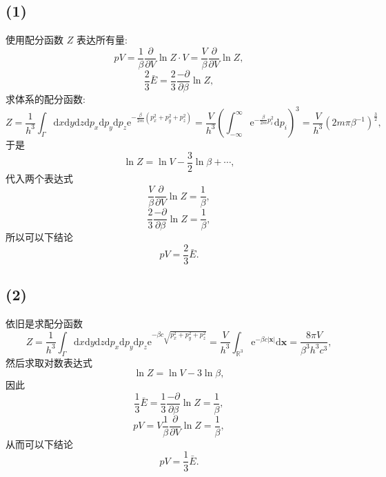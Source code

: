 \documentclass[
    lang=cn,
    column=onecolumn
]{spArticle}
\begin{document}
        \subsection{(1)}
            使用配分函数 $Z$ 表达所有量:
            $$
            pV=\frac{1}{\beta}\frac{\partial}{\partial V}\ln Z\cdot V=\frac{V}{\beta}\frac{\partial}{\partial V}\ln Z,
            $$
            $$
            \frac{2}{3}\bar{E}=\frac{2}{3}\frac{-\partial}{\partial \beta}\ln Z,
            $$
            求体系的配分函数:
            $$
            Z=\frac{1}{h^3}\int_{\Gamma}{\mathrm{d}x\mathrm{d}y\mathrm{d}z\mathrm{d}p_x\mathrm{d}p_y\mathrm{d}p_z\mathrm{e}^{-\frac{\beta}{2m}\left( p_{x}^{2}+p_{y}^{2}+p_{z}^{2} \right)}}
            =\frac{V}{h^3}\left( \int_{-\infty}^{\infty}{\mathrm{e}^{-\frac{\beta}{2m}p_{i}^{2}}\mathrm{d}p_i} \right) ^3=\frac{V}{h^3}\left( 2m\pi \beta ^{-1} \right) ^{\frac{3}{2}},
            $$
            于是
            $$
            \ln Z=\ln V-\frac{3}{2}\ln \beta +\cdots ,
            $$
            代入两个表达式
            $$
            \frac{V}{\beta}\frac{\partial}{\partial V}\ln Z=\frac{1}{\beta},
            $$
            $$
            \frac{2}{3}\frac{-\partial}{\partial \beta}\ln Z=\frac{1}{\beta},
            $$
            所以可以下结论
            $$
            pV=\frac{2}{3}\bar{E}.
            $$
        \subsection{(2)}
            依旧是求配分函数
            $$
            Z=\frac{1}{h^3}\int_{\Gamma}{\mathrm{d}x\mathrm{d}y\mathrm{d}z\mathrm{d}p_x\mathrm{d}p_y\mathrm{d}p_z\mathrm{e}^{-\beta c\sqrt{p_{x}^{2}+p_{y}^{2}+p_{z}^{2}}}}
            =\frac{V}{h^3}\int_{\mathbb{R} ^3}{\mathrm{e}^{-\beta c\left| \mathbf{x} \right|}\mathrm{d}\mathbf{x}}=\frac{8\pi V}{\beta ^3h^3c^3},
            $$
            然后求取对数表达式
            $$
            \ln Z=\ln V-3\ln \beta ,
            $$
            因此
            $$
            \frac{1}{3}\bar{E}=\frac{1}{3}\frac{-\partial}{\partial \beta}\ln Z=\frac{1}{\beta},
            $$
            $$
            pV=V\frac{1}{\beta}\frac{\partial}{\partial V}\ln Z=\frac{1}{\beta},
            $$
            从而可以下结论
            $$
            pV=\frac{1}{3}\bar{E}.
            $$
\end{document}

